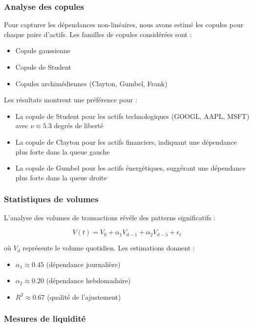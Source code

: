 \documentclass[12pt,a4paper]{article}
\theoremstyle{definition}
\theoremstyle{remark}
\begin{document}
\subsubsection{Analyse des copules}

Pour capturer les dépendances non-linéaires, nous avons estimé les copules pour chaque paire d'actifs. Les familles de copules considérées sont :

\begin{itemize}
    \item Copule gaussienne
    \item Copule de Student
    \item Copules archimédiennes (Clayton, Gumbel, Frank)
\end{itemize}

Les résultats montrent une préférence pour :
\begin{itemize}
    \item La copule de Student pour les actifs technologiques (GOOGL, AAPL, MSFT) avec $\nu \approx 5.3$ degrés de liberté
    \item La copule de Clayton pour les actifs financiers, indiquant une dépendance plus forte dans la queue gauche
    \item La copule de Gumbel pour les actifs énergétiques, suggérant une dépendance plus forte dans la queue droite
\end{itemize}

\subsubsection{Statistiques de volumes}

L'analyse des volumes de transactions révèle des patterns significatifs :

\begin{equation}
V(t) = V_0 + \alpha_1 V_{d-1} + \alpha_2 V_{d-5} + \epsilon_t
\end{equation}

où $V_d$ représente le volume quotidien. Les estimations donnent :
\begin{itemize}
    \item $\alpha_1 \approx 0.45$ (dépendance journalière)
    \item $\alpha_2 \approx 0.20$ (dépendance hebdomadaire)
    \item $R^2 \approx 0.67$ (qualité de l'ajustement)
\end{itemize}

\subsubsection{Mesures de liquidité}
\end{document}
